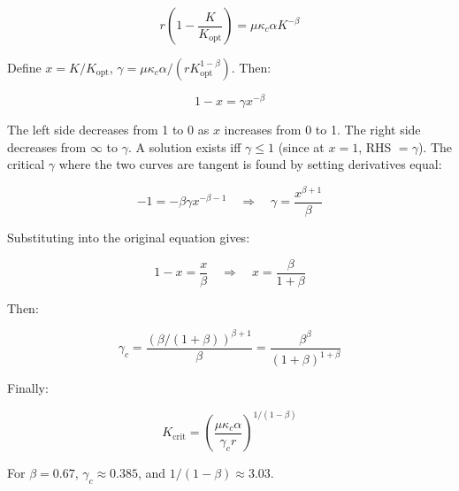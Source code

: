 \documentclass[12pt,a4paper]{article}
\theoremstyle{remark}
\newcommand{\kappac}{\kappa_c}
\begin{document}
	\begin{equation}
		r \left(1 - \frac{K}{K_{\text{opt}}}\right) = \mu \kappac \alpha K^{-\beta}
		\label{eq:stationary-app}
	\end{equation}
	
	Define $x = K/K_{\text{opt}}$, $\gamma = \mu \kappac \alpha / (r K_{\text{opt}}^{1-\beta})$. Then:
	
	\begin{equation}
		1 - x = \gamma x^{-\beta}
		\label{eq:x-eqn}
	\end{equation}
	
	The left side decreases from 1 to 0 as $x$ increases from 0 to 1. The right side decreases from $\infty$ to $\gamma$. A solution exists iff $\gamma \leq 1$ (since at $x=1$, RHS $=\gamma$). The critical $\gamma$ where the two curves are tangent is found by setting derivatives equal:
	
	\begin{equation}
		-1 = -\beta \gamma x^{-\beta-1} \quad \Rightarrow \quad \gamma = \frac{x^{\beta+1}}{\beta}
		\label{eq:derivative}
	\end{equation}
	
	Substituting into the original equation gives:
	
	\begin{equation}
		1 - x = \frac{x}{\beta} \quad \Rightarrow \quad x = \frac{\beta}{1+\beta}
		\label{eq:x-crit}
	\end{equation}
	
	Then:
	
	\begin{equation}
		\gamma_c = \frac{(\beta/(1+\beta))^{\beta+1}}{\beta} = \frac{\beta^{\beta}}{(1+\beta)^{1+\beta}}
		\label{eq:gamma-c-app}
	\end{equation}
	
	Finally:
	
	\begin{equation}
		K_{\text{crit}} = \left( \frac{\mu \kappac \alpha}{\gamma_c r} \right)^{1/(1-\beta)}
		\label{eq:Kcrit-app}
	\end{equation}
	
	For $\beta = 0.67$, $\gamma_c \approx 0.385$, and $1/(1-\beta) \approx 3.03$.
	
\end{document}
